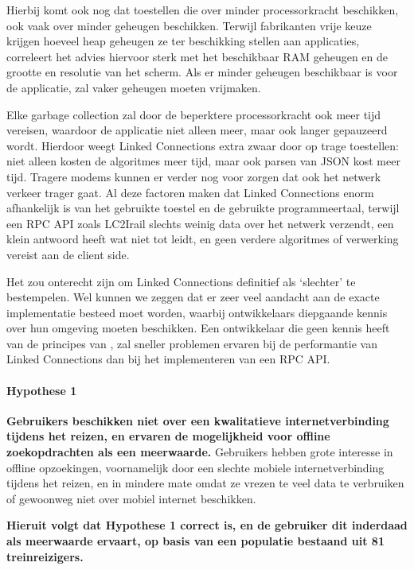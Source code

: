 Hierbij komt ook nog dat toestellen die over minder processorkracht beschikken, ook vaak over minder geheugen beschikken. Terwijl fabrikanten vrije keuze krijgen hoeveel heap geheugen ze ter beschikking stellen aan applicaties, correleert het advies hiervoor sterk met het beschikbaar RAM geheugen en de grootte en resolutie van het scherm. Als er minder geheugen beschikbaar is voor de applicatie, zal  vaker geheugen moeten vrijmaken. 

Elke garbage collection zal door de beperktere processorkracht ook meer tijd vereisen, waardoor de applicatie niet alleen meer, maar ook langer gepauzeerd wordt. Hierdoor weegt Linked Connections extra zwaar door op trage toestellen: niet alleen kosten de algoritmes meer tijd, maar ook parsen van JSON kost meer tijd. Tragere modems kunnen er verder nog voor zorgen dat ook het netwerk verkeer trager gaat. Al deze factoren maken dat Linked Connections enorm afhankelijk is van het gebruikte toestel en de gebruikte programmeertaal, terwijl een RPC API zoals LC2Irail slechts weinig data over het netwerk verzendt, een klein antwoord heeft wat niet tot  leidt, en geen verdere algoritmes of verwerking vereist aan de client side. 

Het zou onterecht zijn om Linked Connections definitief als `slechter' te bestempelen. Wel kunnen we zeggen dat er zeer veel aandacht aan de exacte implementatie besteed moet worden, waarbij ontwikkelaars diepgaande kennis over hun omgeving moeten beschikken. Een ontwikkelaar die geen kennis heeft van de principes van , zal sneller problemen ervaren bij de performantie van Linked Connections dan bij het implementeren van een RPC API.

\paragraph{Hypothese 1} \textbf{Gebruikers beschikken niet over een kwalitatieve internetverbinding tijdens het reizen, en ervaren de mogelijkheid voor offline zoekopdrachten als een meerwaarde.}
	Gebruikers hebben grote interesse in offline opzoekingen, voornamelijk door een slechte mobiele internetverbinding tijdens het reizen, en in mindere mate omdat ze vrezen te veel data te verbruiken of gewoonweg niet over mobiel internet beschikken.
	
\textbf{Hieruit volgt dat Hypothese 1 correct is, en de gebruiker dit inderdaad als meerwaarde ervaart, op basis van een populatie bestaand uit 81 treinreizigers.}


